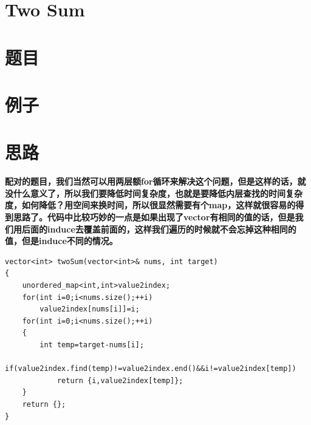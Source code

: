 \documentclass[a4paper, 11pt]{article} %
\begin{document}
\begin{spacing}{1.5}

\section{Two Sum}
\section*{题目}
  \section*{例子}

\section*{思路}
\textbf{\color{blue}配对的题目，我们当然可以用两层额for循环来解决这个问题，但是这样的话，就没什么意义了，所以我们要降低时间复杂度，也就是要降低内层查找的时间复杂度，如何降低？用空间来换时间，所以很显然需要有个map，这样就很容易的得到思路了。代码中比较巧妙的一点是如果出现了vector有相同的值的话，但是我们用后面的induce去覆盖前面的，这样我们遍历的时候就不会忘掉这种相同的值，但是induce不同的情况。}
\begin{lstlisting}[caption={},frame=shadowbox]
vector<int> twoSum(vector<int>& nums, int target)
{
    unordered_map<int,int>value2index;
    for(int i=0;i<nums.size();++i)
        value2index[nums[i]]=i;
    for(int i=0;i<nums.size();++i)
    {
        int temp=target-nums[i];
        if(value2index.find(temp)!=value2index.end()&&i!=value2index[temp])
            return {i,value2index[temp]};
    }
    return {};
}   
\end{lstlisting}


\end{spacing}
\end{document}
